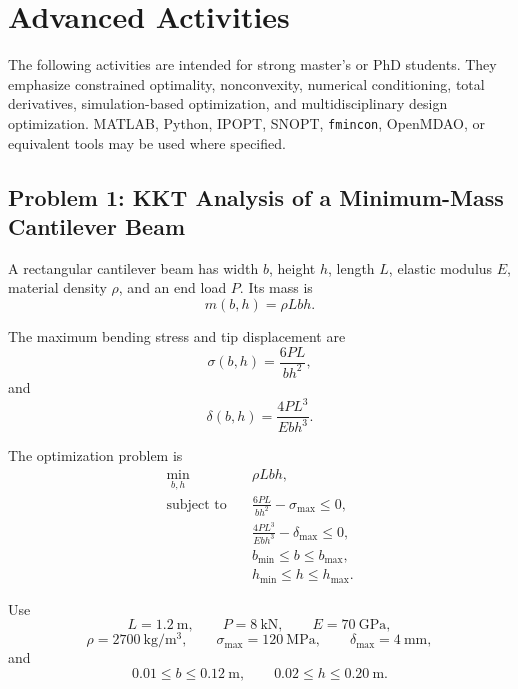 
\section{Advanced Activities}

The following activities are intended for strong master's or PhD students.
They emphasize constrained optimality, nonconvexity, numerical conditioning,
total derivatives, simulation-based optimization, and multidisciplinary
design optimization. MATLAB, Python, IPOPT, SNOPT, \texttt{fmincon},
OpenMDAO, or equivalent tools may be used where specified.

\subsection*{Problem 1: KKT Analysis of a Minimum-Mass Cantilever Beam}

A rectangular cantilever beam has width $b$, height $h$, length $L$,
elastic modulus $E$, material density $\rho$, and an end load $P$.
Its mass is
\begin{equation}
m(b,h)=\rho Lbh.
\end{equation}

The maximum bending stress and tip displacement are
\begin{equation}
\sigma(b,h)=\frac{6PL}{bh^2},
\end{equation}
and
\begin{equation}
\delta(b,h)=\frac{4PL^3}{Ebh^3}.
\end{equation}

The optimization problem is
\begin{align}
\min_{b,h}\quad
& \rho Lbh,
\\
\text{subject to}\quad
& \frac{6PL}{bh^2}-\sigma_{\max}\leq0,
\\
& \frac{4PL^3}{Ebh^3}-\delta_{\max}\leq0,
\\
& b_{\min}\leq b\leq b_{\max},
\\
& h_{\min}\leq h\leq h_{\max}.
\end{align}

Use
\begin{equation}
L=1.2~\mathrm{m},
\qquad
P=8~\mathrm{kN},
\qquad
E=70~\mathrm{GPa},
\end{equation}
\begin{equation}
\rho=2700~\mathrm{kg/m^3},
\qquad
\sigma_{\max}=120~\mathrm{MPa},
\qquad
\delta_{\max}=4~\mathrm{mm},
\end{equation}
and
\begin{equation}
0.01\leq b\leq0.12~\mathrm{m},
\qquad
0.02\leq h\leq0.20~\mathrm{m}.
\end{equation}

